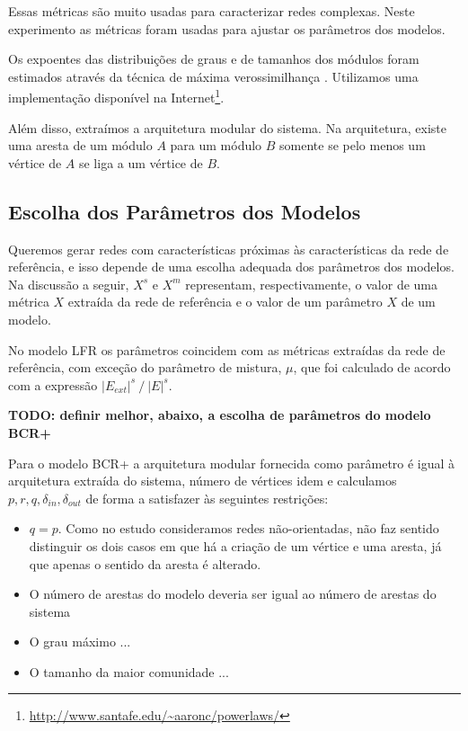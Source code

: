 \documentclass{acm_proc_article-sp}
\begin{document}
Essas métricas são muito usadas para caracterizar redes complexas. Neste experimento as métricas foram usadas para ajustar os parâmetros dos modelos.

Os expoentes das distribuições de graus e de tamanhos dos módulos foram estimados através da técnica de máxima verossimilhança \cite{Clauset2007}. Utilizamos uma implementação disponível na Internet\footnote{\url{http://www.santafe.edu/~aaronc/powerlaws/}}.

Além disso, extraímos a arquitetura modular do sistema. Na arquitetura, existe uma aresta de um módulo $A$ para um módulo $B$ somente se pelo menos um vértice de $A$ se liga a um vértice de $B$.

\subsection{Escolha dos Parâmetros dos Modelos}

Queremos gerar redes com características próximas às características da rede de referência, e isso depende de uma escolha adequada dos parâmetros dos modelos. Na discussão a seguir, $X^s$ e $X^m$ representam, respectivamente, o valor de uma métrica $X$ extraída da rede de referência e o valor de um parâmetro $X$ de um modelo.



No modelo LFR os parâmetros coincidem com as métricas extraídas da rede de referência, com exceção do parâmetro de mistura, $\mu$, que foi calculado de acordo com a expressão $|E_{ext}|^s~/~|E|^s$.

\textbf{TODO: definir melhor, abaixo, a escolha de parâmetros do modelo BCR+}

Para o modelo BCR+ a arquitetura modular fornecida como parâmetro é igual à arquitetura extraída do sistema, número de vértices idem e calculamos $p, r, q, \delta_{in}, \delta_{out}$ de forma a satisfazer às seguintes restrições:
\begin{itemize}
  \item $q = p$. Como no estudo consideramos redes não-orientadas, não faz sentido distinguir os dois casos em que há a criação de um vértice e uma aresta, já que apenas o sentido da aresta é alterado.
  \item O número de arestas do modelo deveria ser igual ao número de arestas do sistema
  \item O grau máximo ...
  \item O tamanho da maior comunidade ...
\end{itemize}
\end{document}
